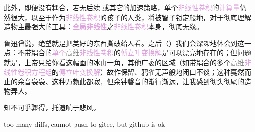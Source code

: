 此外，即便没有\textcolor{NavyBlue}{耦合}，若无后续  或其它的加速策略，单个\textcolor{Plum}{非线性卷积}的\textcolor{Plum}{计算量}仍然很大，以至于作为\textcolor{Plum}{非线性卷积}的孩子的人类，将被\textcolor{NavyBlue}{智子}锁定般地，对于彻底理解造物主最强大的工具：\textbf{\textcolor{Plum}{全局}\textcolor{Plum}{非线性}}之\textcolor{Plum}{非线性卷积}本身，彻底无缘。

鲁迅曾说，绝望就是把美好的东西撕破给人看。之后（）我们会深深地体会到这一点：\textcolor{NavyBlue}{不带耦合}的\textcolor{Plum}{单个}\textcolor{gray}{高维}\textcolor{Plum}{非线性卷积}的\textcolor{Plum}{傅立叶变换}\textcolor{Plum}{解}是可以漂亮地存在的；但问题就是，上帝只给你看这幅画的冰山一角，其他广袤的区域（如\textcolor{NavyBlue}{带耦合}的多个\textcolor{gray}{高维}\textcolor{Plum}{非线性卷积}\textcolor{Plum}{方程组}的\textcolor{Plum}{傅立叶变换}\textcolor{Plum}{解}）故作保留、鸦雀无声般地闭口不谈；这种戛然而止的余音袅袅、这种万赖此都寂，但余钟磬音的渐行渐远，让我感到彻头彻尾的造物弄人。

知不可乎骤得，托遗响于悲风。

\cite{dregerSecondharmonicGenerationNonlinear1990,zubairyAnalyticApproachSecondharmonic1985}

too many diffs, cannot push to gitee, but github is ok

\cite{katoSecondharmonicGeneration20481986,katoTemperaturetuned90Phasematching1994,brunerTemperaturedependentSellmeierEquation2003,jundtTemperaturedependentSellmeierEquation1997,katoSellmeierThermoopticDispersion2002}